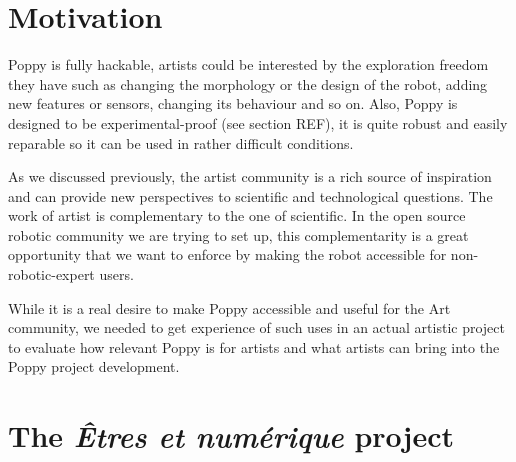 \begin{figure}[t]
\centering
    \hfil
    \caption{}
    \label{fig:robot_emotion_cinema}
\end{figure}


\section{Motivation } %
\label{sec:motivation}


Poppy is fully hackable, artists could be interested by the exploration freedom they have such as changing the morphology or the design of the robot, adding new features or sensors, changing its behaviour and so on. Also, Poppy is designed to be experimental-proof (see section REF), it is quite robust and easily reparable so it can be used in rather difficult conditions.

As we discussed previously, the artist community is a rich source of inspiration and can provide new perspectives to scientific and technological questions. The work of artist is complementary to the one of scientific. In the open source robotic community we are trying to set up, this complementarity is a great opportunity that we want to enforce by making the robot accessible for non-robotic-expert users.

While it is a real desire to make Poppy accessible and useful for the Art community, we needed to get experience of such uses in an actual artistic project to evaluate how relevant Poppy is for artists and what artists can bring into the Poppy project development.


\section{The \emph{Êtres et numérique} project} %

